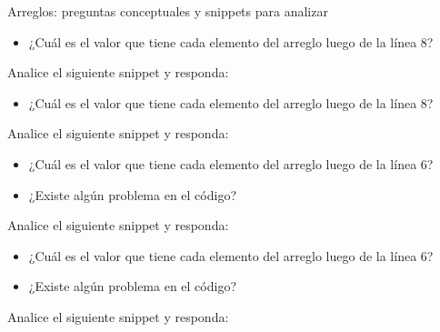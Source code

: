 \documentclass[xcolor=pdftex,table,11pt]{beamer}
\begin{document}
\begin{frame}[allowframebreaks]{Arreglos: preguntas conceptuales y snippets para analizar}
\codesetstylefrombeamer
{}


\begin{itemize}

\item ¿Cuál es el valor que tiene cada elemento del arreglo luego de la línea 8?

\end{itemize}




\newpage

Analice el siguiente snippet y responda:

\codesetstylefrombeamer
{}


\begin{itemize}

\item ¿Cuál es el valor que tiene cada elemento del arreglo luego de la línea 8?

\end{itemize}


\newpage

Analice el siguiente snippet y responda:

\codesetstylefrombeamer
{}


\begin{itemize}

\item ¿Cuál es el valor que tiene cada elemento del arreglo luego de la línea 6?


\item ¿Existe algún problema en el código?
\end{itemize}

\newpage

Analice el siguiente snippet y responda:

\codesetstylefrombeamer
{}


\begin{itemize}

\item ¿Cuál es el valor que tiene cada elemento del arreglo luego de la línea 6?


\item ¿Existe algún problema en el código?

\end{itemize}

\newpage

Analice el siguiente snippet y responda:


\end{frame}
\end{document}
